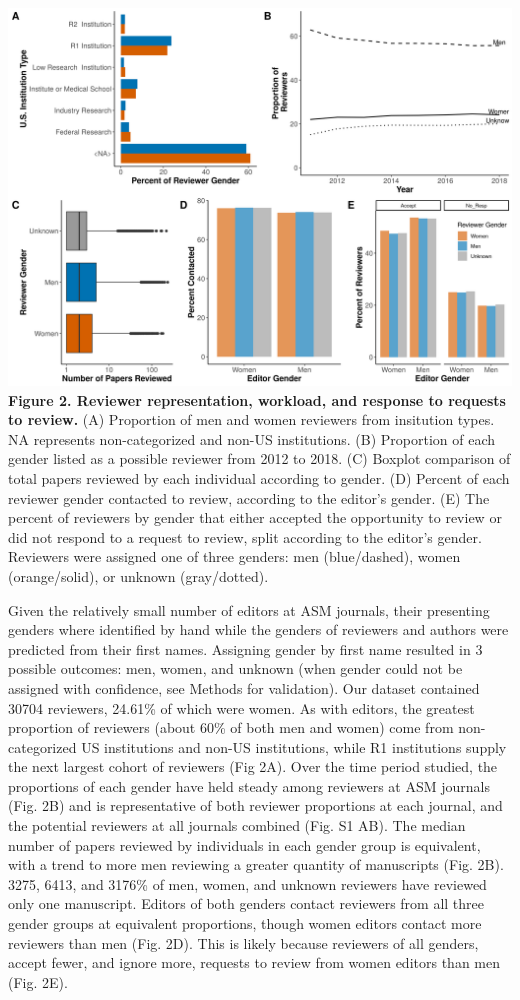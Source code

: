 \documentclass[11pt,]{article}
\begin{document}
\includegraphics{Figure_2.png} \textbf{Figure 2. Reviewer
representation, workload, and response to requests to review.} (A)
Proportion of men and women reviewers from insitution types. NA
represents non-categorized and non-US institutions. (B) Proportion of
each gender listed as a possible reviewer from 2012 to 2018. (C) Boxplot
comparison of total papers reviewed by each individual according to
gender. (D) Percent of each reviewer gender contacted to review,
according to the editor's gender. (E) The percent of reviewers by gender
that either accepted the opportunity to review or did not respond to a
request to review, split according to the editor's gender. Reviewers
were assigned one of three genders: men (blue/dashed), women
(orange/solid), or unknown (gray/dotted).

Given the relatively small number of editors at ASM journals, their
presenting genders where identified by hand while the genders of
reviewers and authors were predicted from their first names. Assigning
gender by first name resulted in 3 possible outcomes: men, women, and
unknown (when gender could not be assigned with confidence, see Methods
for validation). Our dataset contained 30704 reviewers, 24.61\% of which
were women. As with editors, the greatest proportion of reviewers (about
60\% of both men and women) come from non-categorized US institutions
and non-US institutions, while R1 institutions supply the next largest
cohort of reviewers (Fig 2A). Over the time period studied, the
proportions of each gender have held steady among reviewers at ASM
journals (Fig. 2B) and is representative of both reviewer proportions at
each journal, and the potential reviewers at all journals combined (Fig.
S1 AB). The median number of papers reviewed by individuals in each
gender group is equivalent, with a trend to more men reviewing a greater
quantity of manuscripts (Fig. 2B). 3275, 6413, and 3176\% of men, women,
and unknown reviewers have reviewed only one manuscript. Editors of both
genders contact reviewers from all three gender groups at equivalent
proportions, though women editors contact more reviewers than men (Fig.
2D). This is likely because reviewers of all genders, accept fewer, and
ignore more, requests to review from women editors than men (Fig. 2E).
\end{document}

